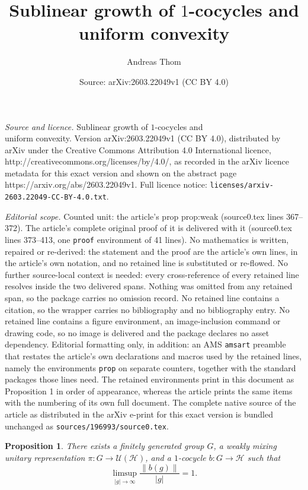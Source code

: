 \documentclass[10pt,a4paper]{amsart}
\title{Sublinear growth of $1$-cocycles and \\ uniform convexity}
\author{Andreas Thom}
\date{Source: arXiv:2603.22049v1 (CC BY 4.0)}
\newtheorem{prop}{Proposition}
\newcommand{\cH}{\mathcal H}
\begin{document}
\maketitle

\noindent\emph{Source and licence.} Sublinear growth of $1$-cocycles and \\ uniform convexity. Version arXiv:2603.22049v1 (CC BY 4.0), distributed by arXiv under the Creative Commons Attribution 4.0 International licence, http://creativecommons.org/licenses/by/4.0/, as recorded in the arXiv licence metadata for this exact version and shown on the abstract page https://arxiv.org/abs/2603.22049v1. Full licence notice: \texttt{licenses/arxiv-2603.22049-CC-BY-4.0.txt}.\par\smallskip

\noindent\textit{Editorial scope.} Counted unit: the article's prop prop:weak (source0.tex lines 367--372). The article's complete original proof of it is delivered with it (source0.tex lines 373--413, one \texttt{proof} environment of 41 lines). No mathematics is written, repaired or re-derived: the statement and the proof are the article's own lines, in the article's own notation, and no retained line is substituted or re-flowed.  No further source-local context is needed: every cross-reference of every retained line resolves inside the two delivered spans.  Nothing was omitted from any retained span, so the package carries no omission record.  No retained line contains a citation, so the wrapper carries no bibliography and no bibliography entry.  No retained line contains a figure environment, an image-inclusion command or drawing code, so no image is delivered and the package declares no asset dependency.  Editorial formatting only, in addition: an AMS \texttt{amsart} preamble that restates the article's own declarations and macros used by the retained lines, namely the environments \texttt{prop} on separate counters, together with the standard packages those lines need.  The retained environments print in this document as Proposition 1 in order of appearance, whereas the article prints the same items with the numbering of its own full document.  The complete native source of the article as distributed in the arXiv e-print for this exact version is bundled unchanged as \texttt{sources/196993/source0.tex}.
\begin{prop}\label{prop:weak}
There exists a finitely generated group $G$, a weakly mixing unitary representation $\pi\colon G\to \mathcal U(\cH)$, and a $1$-cocycle $b\colon G\to \cH$ such that
\[
\limsup_{|g|\to\infty}\frac{\|b(g)\|}{|g|}=1.
\]
\end{prop}
\end{document}
